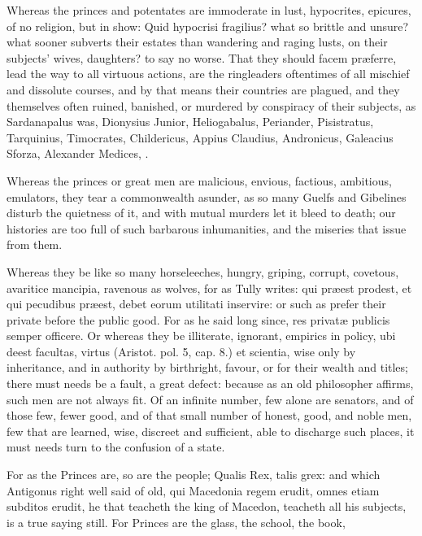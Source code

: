 {Whereas the princes and potentates are immoderate in lust, hypocrites,
epicures, of no religion, but in show: Quid hypocrisi fragilius? what
so brittle and unsure? what sooner subverts their estates than
wandering and raging lusts, on their subjects' wives, daughters? to say
no worse. That they should facem pr\ae{}ferre, lead the way to all
virtuous actions, are the ringleaders oftentimes of all mischief and
dissolute courses, and by that means their countries are plagued,
and they themselves often ruined, banished, or murdered by
conspiracy of their subjects, as Sardanapalus was, Dionysius Junior,
Heliogabalus, Periander, Pisistratus, Tarquinius, Timocrates,
Childericus, Appius Claudius, Andronicus, Galeacius Sforza, Alexander
Medices, \etc{}.

Whereas the princes or great men are malicious, envious, factious,
ambitious, emulators, they tear a commonwealth asunder, as so many
Guelfs and Gibelines disturb the quietness of it, and with mutual
murders let it bleed to death; our histories are too full of such
barbarous inhumanities, and the miseries that issue from them.

Whereas they be like so many horseleeches, hungry, griping, corrupt,
 covetous, avaritice mancipia, ravenous as wolves, for as Tully
writes: qui pr\ae{}est prodest, et qui pecudibus pr\ae{}est, debet eorum
utilitati inservire: or such as prefer their private before the public
good. For as he said long since, res privat\ae{} publicis semper
officere. Or whereas they be illiterate, ignorant, empirics in policy,
ubi deest facultas, virtus (Aristot. pol. 5, cap. 8.) et scientia,
wise only by inheritance, and in authority by birthright, favour, or
for their wealth and titles; there must needs be a fault, a great
defect: because as an old philosopher affirms, such men are not
always fit. Of an infinite number, few alone are senators, and of those
few, fewer good, and of that small number of honest, good, and noble
men, few that are learned, wise, discreet and sufficient, able to
discharge such places, it must needs turn to the confusion of a state.

For as the Princes are, so are the people; Qualis Rex, talis grex:
and which Antigonus right well said of old, qui Macedonia regem
erudit, omnes etiam subditos erudit, he that teacheth the king of
Macedon, teacheth all his subjects, is a true saying still.
For Princes are the glass, the school, the book,

}
